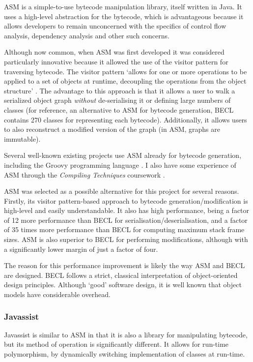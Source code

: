 		ASM \citep{Bruneton2002} is a simple-to-use bytecode manipulation library, itself written in Java. It uses a high-level abstraction for the bytecode, which is advantageous because it allows developers to remain unconcerned with the specifics of control flow analysis, dependency analysis and other such concerns.
		
		Although now common, when ASM was first developed it was considered particularly innovative because it allowed the use of the visitor pattern \citep[p.~331]{Gamma1995} for traversing bytecode. The visitor pattern `allows for one or more operations to be applied to a set of objects at runtime, decoupling the operations from the object structure' \citep{McDonald2008}. The advantage to this approach is that it allows a user to walk a serialized object graph \emph{without} de-serialising it or defining large numbers of classes (for reference, an alternative to ASM for bytecode generation, BECL \citep{ApacheBECL} contains 270 classes for representing each bytecode). Additionally, it allows users to also reconstruct a modified version of the graph (in ASM, graphs are immutable).
		
		Several well-known existing projects use ASM already for bytecode generation, including the Groovy programming language \citep{GroovyDocs}. I also have some experience of ASM through the \textit{Compiling Techniques} coursework \citep{CTcoursework}.
		
		ASM was selected as a possible alternative for this project for several reasons. Firstly, its visitor pattern-based approach to bytecode generation/modification is high-level and easily understandable. It also has high performance, being a factor of 12 more performance than BECL for serialisation/deserialisation, and a factor of 35 times more performance than BECL for computing maximum stack frame sizes. ASM is also superior to BECL for performing modifications, although with a significantly lower margin of just a factor of four.
		
		The reason for this performance improvement is likely the way ASM and BECL are designed. BECL follows a strict, classical interpretation of object-oriented design principles. Although `good' software design, it is well known that object models have considerable overhead.

		\subsubsection{Javassist} \label{sec:instrumentation/alt-instr/bytecode-instr/javassist}
		Javassist \citep{Chiba1998} is similar to ASM in that it is also a library for manipulating bytecode, but its method of operation is significantly different. It allows for run-time polymorphism, by dynamically switching implementation of classes at run-time.
	

